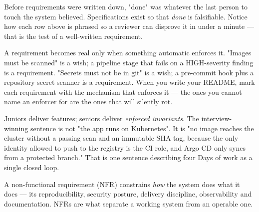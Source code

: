  Before requirements were written down, "done" was whatever the last person to touch the system believed. Specifications exist so that \emph{done} is falsifiable. Notice how each row above is phrased so a reviewer can disprove it in under a minute --- that is the test of a well-written requirement.

 A requirement becomes real only when something automatic enforces it. "Images must be scanned" is a wish; a pipeline stage that fails on a HIGH-severity finding is a requirement. "Secrets must not be in git" is a wish; a pre-commit hook plus a repository secret scanner is a requirement. When you write your README, mark each requirement with the mechanism that enforces it --- the ones you cannot name an enforcer for are the ones that will silently rot.

\begin{seniornote}
Juniors deliver features; seniors deliver \emph{enforced invariants}. The interview-winning sentence is not "the app runs on Kubernetes". It is "no image reaches the cluster without a passing scan and an immutable SHA tag, because the only identity allowed to push to the registry is the CI role, and Argo CD only syncs from a protected branch." That is one sentence describing four Days of work as a single closed loop.
\end{seniornote}


 A non-functional requirement (NFR) constrains \emph{how} the system does what it does --- its reproducibility, security posture, delivery discipline, observability and documentation. NFRs are what separate a working system from an operable one.

